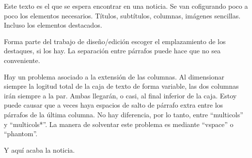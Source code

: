 Este texto es el que se espera encontrar en una noticia. Se van cofigurando poco a poco los elementos necesarios. Títulos, subtítulos, columnas, imágenes sencillas. Incluso los elementos destacados.

Forma parte del trabajo de diseño/edición escoger el emplazamiento de los destaques, si los hay. La separación entre párrafos puede hace que no sea conveniente.


Hay un problema asociado a la extensión de las columnas. Al dimensionar siempre la logitud total de la caja de texto de forma variable, las dos columnas irán siempre a la par. Ambas llegarán, o casi, al final inferior de la caja. Estoy puede causar que a veces haya espacios de salto de párrafo extra entre los párrafos de la última columna. No hay diferencia, por lo tanto, entre \enquote{multicols} y \enquote{multicols*}. La manera de solventar este problema es mediante \enquote{vspace} o \enquote{phantom}.

\lipsum[1-6]

Y aquí acaba la noticia.